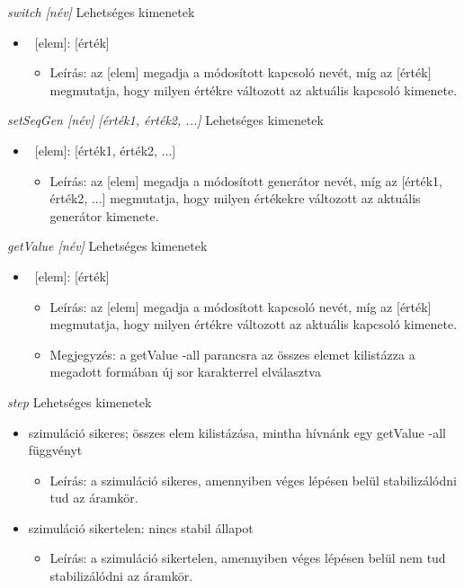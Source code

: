\textit{switch [név]}\newline
Lehetséges kimenetek
\begin{itemize}
	\item ~[elem]: [érték]
	\begin{itemize}
		\item Leírás: az [elem] megadja a módosított kapcsoló nevét, míg az [érték] megmutatja, hogy milyen értékre változott az aktuális kapcsoló kimenete. 
	\end{itemize}
\end{itemize}

\textit{setSeqGen [név] [érték1, érték2, ...]}\newline
Lehetséges kimenetek
\begin{itemize}
	\item ~[elem]: [érték1, érték2, ...]
	\begin{itemize}
		\item Leírás: az [elem] megadja a módosított generátor nevét, míg az [érték1, érték2, ...] megmutatja, hogy milyen értékekre változott az aktuális generátor kimenete. 
	\end{itemize}
\end{itemize}

\textit{getValue [név]}\newline
Lehetséges kimenetek
\begin{itemize}
	\item ~[elem]: [érték]
	\begin{itemize}
		\item Leírás: az [elem] megadja a módosított kapcsoló nevét, míg az [érték] megmutatja, hogy milyen értékre változott az aktuális kapcsoló kimenete.
		\item Megjegyzés: a getValue -all parancsra az összes elemet kilistázza a megadott formában új sor karakterrel elválasztva
	\end{itemize}
\end{itemize}

\textit{step}\newline
Lehetséges kimenetek
\begin{itemize}
	\item szimuláció sikeres; összes elem kilistázása, mintha hívnánk egy getValue -all függvényt
	\begin{itemize}
		\item Leírás: a szimuláció sikeres, amennyiben véges lépésen belül stabilizálódni tud az áramkör.
	\end{itemize}
	\item szimuláció sikertelen: nincs stabil állapot
	\begin{itemize}
		\item Leírás: a szimuláció sikertelen, amennyiben véges lépésen belül nem tud stabilizálódni az áramkör.
	\end{itemize}
\end{itemize}

